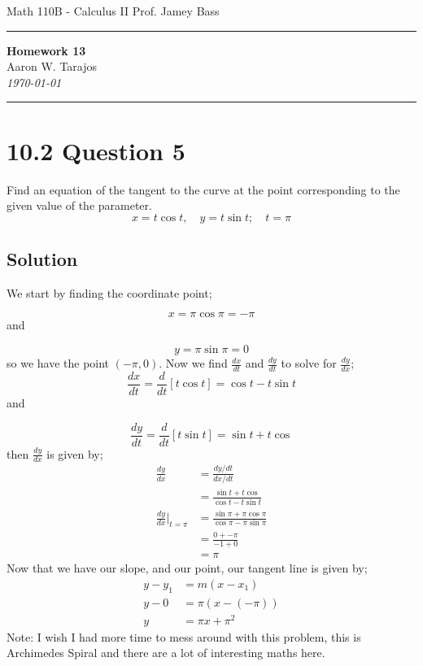 \documentclass{article}
\begin{document}
\noindent
Math 110B - Calculus II  \hfill Prof. Jamey Bass

\noindent\rule{\textwidth}{0.4pt}

\begin{center}
    \textbf{\LARGE Homework 13} \\
    \vspace{12pt}
    \large Aaron W. Tarajos \\
    \textit{\today}
\end{center}

\noindent\rule{\textwidth}{0.4pt}

\section*{10.2 Question 5}
Find an equation of the tangent to the curve at the point
corresponding to the given value of the parameter.
\[
	x = t\cos t, \quad y = t\sin t; \quad t = \pi
\]

\subsection*{Solution}
We start by finding the coordinate point;

\[
	x = \pi \cos \pi = -\pi
\]
and

\[
	y = \pi \sin \pi = 0
\]
so we have the point $(-\pi,0)$. Now we find $\frac{dx}{dt}$ and $\frac{dy}{dt}$ to solve for $\frac{dy}{dx}$;
\[
	\frac{dx}{dt} = \frac{d}{dt} \left[ t \cos t \right] = \cos t - t \sin t
\]
and

\[
	\frac{dy}{dt} = \frac{d}{dt} \left[ t \sin t \right] = \sin t + t\cos
\]
then $\frac{dy}{dx}$ is given by;
\begin{align*}
	\frac{dy}{dx} &= \frac{dy/dt}{dx/dt} \\
		      &= \frac{\sin t + t\cos}{\cos t - t \sin t} \\
\frac{dy}{dx}\bigg\rvert_{t=\pi} &= \frac{\sin \pi + \pi \cos \pi}{\cos \pi - \pi \sin \pi} \\
				 &= \frac{0 + -\pi}{-1 + 0} \\
				 &= \pi
\end{align*}
Now that we have our slope, and our point, our tangent line is given by;
\begin{align*}
	y - y_1 &= m(x-x_1) \\
	y - 0 &= \pi(x-(-\pi)) \\
	y &= \pi x + \pi^2
\end{align*}
Note: I wish I had more time to mess around with this problem, this is Archimedes Spiral and there are a lot of interesting maths here.
\end{document}

